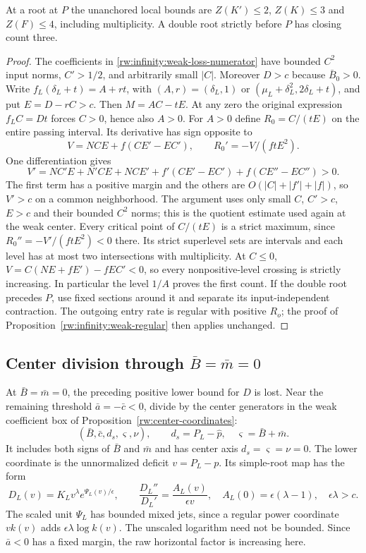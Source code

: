 \begin{proposition}
\label{rw:infinity:weak-loss}
At a root at $P$ the unanchored local bounds are $Z(K')\le2$,
$Z(K)\le3$ and $Z(F)\le4$, including multiplicity.
A double root strictly before $P$ has closing count three.
\end{proposition}
\begin{proof}
The coefficients in \eqref{rw:infinity:weak-loss-numerator} have
bounded $C^2$ input norms, $C'>1/2$, and arbitrarily small $|C|$.
Moreover $D>c$ because $\bar B_0>0$.
Write $f_L(\delta_L+t)=A+rt$, with
$(A,r)=(\delta_L,1)$ or
$(\mu_L+\delta_L^2,2\delta_L+t)$, and put $E=D-rC>c$.
Then $M=AC-tE$. At any zero the original expression
$f_L C=Dt$ forces $C>0$, hence also $A>0$.
For $A>0$ define $R_0=C/(tE)$ on the entire passing interval.
Its derivative has sign opposite to
\[
 V=NCE+f(CE'-EC'),\qquad
 R_0'=-V/(ftE^2).
\]
One differentiation gives
\[
 V'=NC'E+N'CE+NCE'+f'(CE'-EC')+f(CE''-EC'')>0.
\]
The first term has a positive margin and the others are
$O(|C|+|f'|+|f|)$, so $V'>c$ on a common neighborhood.
The argument uses only small $C$, $C'>c$, $E>c$ and their bounded
$C^2$ norms; this is the quotient estimate used again at the weak center.
Every critical point of $C/(tE)$ is a strict maximum, since
$R_0''=-V'/(ftE^2)<0$ there. Its strict superlevel sets are intervals
and each level has at most two intersections with multiplicity.
At $C\le0$, $V=C(NE+fE')-fEC'<0$, so every nonpositive-level
crossing is strictly increasing. In particular the level $1/A$
proves the first count.
If the double root precedes $P$, use fixed sections around it and
separate its input-independent contraction. The outgoing entry rate
is regular with positive $R_o$; the proof of
Proposition~\ref{rw:infinity:weak-regular} then applies unchanged.
\end{proof}

\subsection{Center division through \texorpdfstring{$\bar B=\bar m=0$}{B=m=0}}
\label{rw:infinity:weak-center-section}

At $\bar B=\bar m=0$, the preceding positive lower bound for $D$
is lost. Near the remaining threshold $\bar a=-\bar c<0$, divide
by the center generators in the weak coefficient box of
Proposition~\ref{rw:center-coordinates}:
\[
 (\bar B,\bar c,d_s,\varsigma,\nu),\qquad
 d_s=P_L-\widehat p,\quad\varsigma=\bar B+\bar m.
\]
It includes both signs of $\bar B$ and $\bar m$ and has center
axis $d_s=\varsigma=\nu=0$. The lower coordinate is the unnormalized
deficit $v=P_L-p$. Its simple-root map has the form
\[
 D_L(v)=K_Lv^\lambda e^{\Psi_L(v)/\epsilon},\qquad
 \frac{D_L''}{D_L'}=\frac{A_L(v)}{\epsilon v},\quad
 A_L(0)=\epsilon(\lambda-1),\quad\epsilon\lambda>c.
\]
The scaled unit $\Psi_L$ has bounded mixed jets, since a regular
power coordinate $v k(v)$ adds $\epsilon\lambda\log k(v)$.
The unscaled logarithm need not be bounded. Since $\bar a<0$
has a fixed margin, the raw horizontal factor is increasing here.

